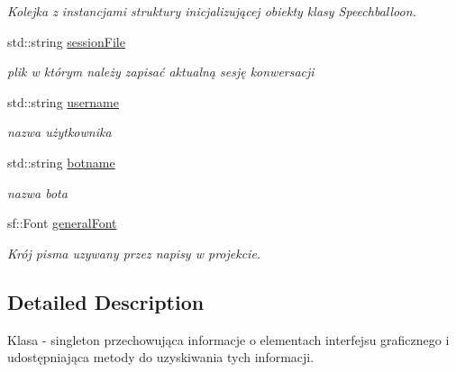 \begin{DoxyCompactItemize}
\begin{DoxyCompactList}\small\item\em Kolejka z instancjami struktury inicjalizującej obiekty klasy Speechballoon. \end{DoxyCompactList}\item 
\mbox{\label{class_settings_container_a5167929dc337607ea2c79aaf192f05b3}} 
std\+::string \mbox{\hyperlink{class_settings_container_a5167929dc337607ea2c79aaf192f05b3}{session\+File}}
\begin{DoxyCompactList}\small\item\em plik w którym należy zapisać aktualną sesję konwersacji \end{DoxyCompactList}\item 
\mbox{\label{class_settings_container_ae06f85aee3467ebfe0178ec905d22847}} 
std\+::string \mbox{\hyperlink{class_settings_container_ae06f85aee3467ebfe0178ec905d22847}{username}}
\begin{DoxyCompactList}\small\item\em nazwa użytkownika \end{DoxyCompactList}\item 
\mbox{\label{class_settings_container_a83cbf80e5663aaa7845b76b0ab732377}} 
std\+::string \mbox{\hyperlink{class_settings_container_a83cbf80e5663aaa7845b76b0ab732377}{botname}}
\begin{DoxyCompactList}\small\item\em nazwa bota \end{DoxyCompactList}\item 
\mbox{\label{class_settings_container_a492151e38701ed38bb47b94a68e5ec04}} 
sf\+::\+Font \mbox{\hyperlink{class_settings_container_a492151e38701ed38bb47b94a68e5ec04}{general\+Font}}
\begin{DoxyCompactList}\small\item\em Krój pisma uzywany przez napisy w projekcie. \end{DoxyCompactList}\end{DoxyCompactItemize}


\subsection{Detailed Description}
Klasa -\/ singleton przechowująca informacje o elementach interfejsu graficznego i udostępniająca metody do uzyskiwania tych informacji. 


